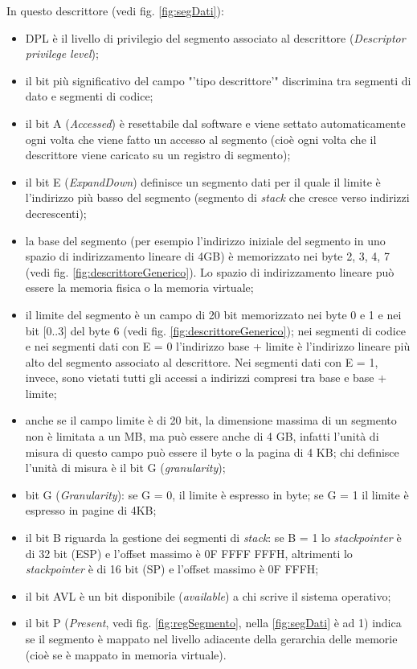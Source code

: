 In questo descrittore (vedi fig. \ref{fig:segDati}):
\begin{itemize}
\item DPL è il livello di privilegio del segmento associato al descrittore (\textit{Descriptor privilege level});
\item il bit più significativo del campo "'tipo descrittore'" discrimina tra segmenti di dato e segmenti di codice;
\item il bit A (\textit{Accessed}) è resettabile dal software e viene settato automaticamente ogni volta che viene fatto un accesso al segmento (cioè ogni volta che il descrittore viene caricato su un registro di segmento);
\item il bit E (\textit{ExpandDown}) definisce un segmento dati per il quale il limite è l'indirizzo più basso del segmento (segmento di \textit{stack} che cresce verso indirizzi decrescenti);
\item la base del segmento (per esempio l'indirizzo iniziale del segmento in uno spazio di indirizzamento lineare di 4GB) è memorizzato nei byte 2, 3, 4, 7 (vedi fig. \ref{fig:descrittoreGenerico}). Lo spazio di indirizzamento lineare può essere la memoria fisica o la memoria virtuale;
\item il limite del segmento è un campo di 20 bit memorizzato nei byte 0 e 1 e nei bit [0..3] del byte 6 (vedi fig. \ref{fig:descrittoreGenerico}); nei segmenti di codice e nei segmenti dati con E = 0 l'indirizzo base + limite è l'indirizzo lineare più alto del segmento associato al descrittore. Nei segmenti dati con E = 1, invece, sono vietati tutti gli accessi a indirizzi compresi tra base e base + limite;
\item anche se il campo limite è di 20 bit, la dimensione massima di un segmento non è limitata a un MB, ma può essere anche di 4 GB, infatti l'unità di misura di questo campo può essere il byte o la pagina di 4 KB; chi definisce l'unità di misura è il bit G (\textit{granularity});
\item bit G (\textit{Granularity}): se G = 0, il limite è espresso in byte; se G = 1 il limite è espresso in pagine di 4KB;
\item il bit B riguarda la gestione dei segmenti di \textit{stack}: se B = 1 lo \textit{stackpointer} è di 32 bit (ESP) e l'offset massimo è 0F FFFF FFFH, altrimenti lo \textit{stackpointer} è di 16 bit (SP) e l'offset massimo è 0F FFFH;
\item il bit AVL è un bit disponibile (\textit{available}) a chi scrive il sistema operativo;
\item il bit P (\textit{Present}, vedi fig. \ref{fig:regSegmento}, nella \ref{fig:segDati} è ad 1) indica se il segmento è mappato nel livello adiacente della gerarchia delle memorie (cioè se è mappato in memoria virtuale).
\end{itemize}


